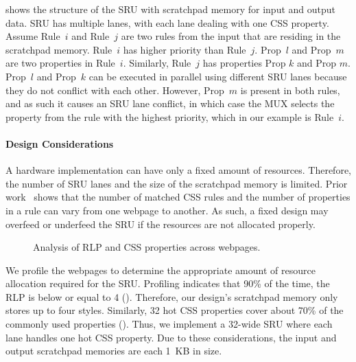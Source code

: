  shows the structure of the SRU with scratchpad memory for input and output data. SRU has multiple lanes, with each lane dealing with one CSS property. Assume Rule~$i$ and Rule~$j$ are two rules from the input that are residing in the scratchpad memory. Rule~$i$ has higher priority than Rule~$j$. Prop~$l$ and Prop~$m$ are two properties in Rule~$i$. Similarly, Rule~$j$ has properties Prop $k$ and Prop $m$. Prop~$l$ and Prop~$k$ can be executed in parallel using different SRU lanes because they do not conflict with each other. However, Prop~$m$ is present in both rules, and as such it causes an SRU lane conflict, in which case the MUX selects the property from the rule with the highest priority, which in our example is Rule~$i$.


\paragraph{Design Considerations} A hardware implementation can have only a fixed amount of resources. Therefore, the number of SRU lanes and the size of the scratchpad memory is limited. Prior work~\cite{big-little} shows that the number of matched CSS rules and the number of properties in a rule can vary from one webpage to another. As such, a fixed design may overfeed or underfeed the SRU if the resources are not allocated properly.

\begin{figure}[t]
\centering
{}
\hspace*{15pt}
\caption{Analysis of RLP and CSS properties across webpages.}
\label{fig:para}
\end{figure}

We profile the webpages to determine the appropriate amount of resource allocation required for the SRU. Profiling indicates that 90\% of the time, the RLP is below or equal to 4 (). Therefore, our design's scratchpad memory only stores up to four styles. Similarly, 32 hot CSS properties cover about 70\% of the commonly used properties (). Thus, we implement a 32-wide SRU where each lane handles one hot CSS property. Due to these considerations, the input and output scratchpad memories are each 1~KB in size.

